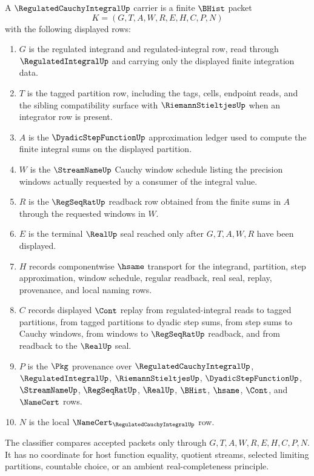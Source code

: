 \begin{definition}
\label{def:regulated-cauchy-integral-carrier}
A $\RegulatedCauchyIntegralUp$ carrier is a finite $\BHist$ packet
$$
K=(G,T,A,W,R,E,H,C,P,N)
$$
with the following displayed rows:
\begin{enumerate}
\item $G$ is the regulated integrand and regulated-integral row, read through $\RegulatedIntegralUp$ and carrying only the displayed finite integration data.
\item $T$ is the tagged partition row, including the tags, cells, endpoint reads, and the sibling compatibility surface with $\RiemannStieltjesUp$ when an integrator row is present.
\item $A$ is the $\DyadicStepFunctionUp$ approximation ledger used to compute the finite integral sums on the displayed partition.
\item $W$ is the $\StreamNameUp$ Cauchy window schedule listing the precision windows actually requested by a consumer of the integral value.
\item $R$ is the $\RegSeqRatUp$ readback row obtained from the finite sums in $A$ through the requested windows in $W$.
\item $E$ is the terminal $\RealUp$ seal reached only after $G,T,A,W,R$ have been displayed.
\item $H$ records componentwise $\hsame$ transport for the integrand, partition, step approximation, window schedule, regular readback, real seal, replay, provenance, and local naming rows.
\item $C$ records displayed $\Cont$ replay from regulated-integral reads to tagged partitions, from tagged partitions to dyadic step sums, from step sums to Cauchy windows, from windows to $\RegSeqRatUp$ readback, and from readback to the $\RealUp$ seal.
\item $P$ is the $\Pkg$ provenance over $\RegulatedCauchyIntegralUp$, $\RegulatedIntegralUp$, $\RiemannStieltjesUp$, $\DyadicStepFunctionUp$, $\StreamNameUp$, $\RegSeqRatUp$, $\RealUp$, $\BHist$, $\hsame$, $\Cont$, and $\NameCert$ rows.
\item $N$ is the local $\NameCert_{\RegulatedCauchyIntegralUp}$ row.
\end{enumerate}
The classifier compares accepted packets only through $G,T,A,W,R,E,H,C,P,N$. It has no coordinate for host function equality, quotient streams, selected limiting partitions, countable choice, or an ambient real-completeness principle.
\end{definition}


